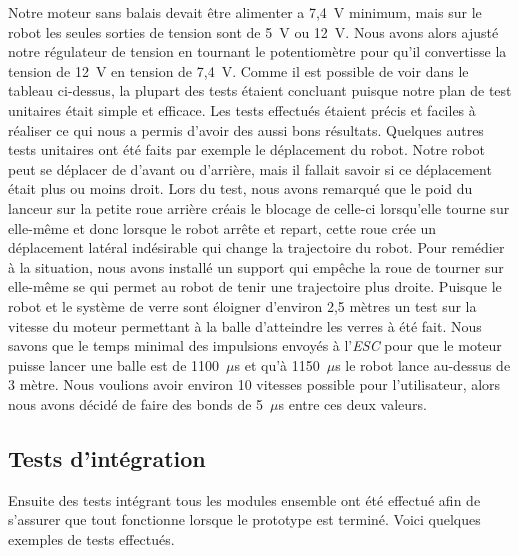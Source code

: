 Notre moteur sans balais devait être alimenter a 7,4~V minimum, mais sur le robot les seules sorties de tension sont de 5~V ou 12~V.
Nous avons alors ajusté notre régulateur de tension en tournant le potentiomètre pour qu’il convertisse la tension de 12~V en tension de 7,4~V.
Comme il est possible de voir dans le tableau ci-dessus, la plupart des tests étaient concluant puisque notre plan de test unitaires était simple et efficace.
Les tests effectués étaient précis et faciles à réaliser ce qui nous a permis d’avoir des aussi bons résultats.
Quelques autres tests unitaires ont été faits par exemple le déplacement du robot.
Notre robot peut se déplacer de d’avant ou d’arrière, mais il fallait savoir si ce déplacement était plus ou moins droit.
Lors du test, nous avons remarqué que le poid du lanceur sur la petite roue arrière créais le blocage de celle-ci lorsqu’elle tourne sur elle-même et donc lorsque le robot arrête et repart, cette roue crée un déplacement latéral indésirable qui change la trajectoire du robot.
Pour remédier à la situation, nous avons installé un support qui empêche la roue de tourner sur elle-même se qui permet au robot de tenir une trajectoire plus droite.
Puisque le robot et le système de verre sont éloigner d’environ 2,5 mètres un test sur la vitesse du moteur permettant à la balle d’atteindre les verres à été fait.
Nous savons que le temps minimal des impulsions envoyés à l'\emph{ESC} pour que le moteur puisse lancer une balle est de 1100~$\mu$s et qu’à 1150~$\mu$s le robot lance au-dessus de 3 mètre.
Nous voulions avoir environ 10 vitesses possible pour l’utilisateur, alors nous avons décidé de faire des bonds de 5~$\mu$s entre ces deux valeurs.

\subsection{Tests d'intégration}

Ensuite des tests intégrant tous les modules ensemble ont été effectué afin de s’assurer que tout fonctionne lorsque le prototype est terminé.
Voici quelques exemples de tests effectués.

